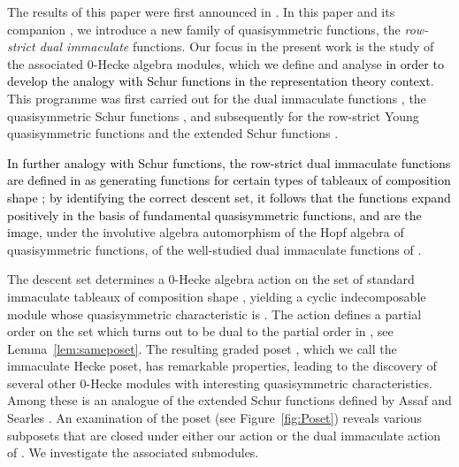 \documentclass[12pt,letterpaper]{amsart}
\newcommand{\svw}{\textcolor{black}}
\theoremstyle{definition}
\begin{document}
The results of this paper were  first announced in \cite{NSvWVW2022FPSAC}. 
In this paper and its companion \cite{NSvWVW2023}, we introduce a new family of quasisymmetric functions, the \emph{row-strict dual immaculate} functions.  Our focus in the present work is the study of the associated 0-Hecke algebra modules, which we define and analyse \svw{in order to develop the analogy with Schur functions in the representation theory context}. This programme was first carried out for the dual immaculate functions \cite{BBSSZ2015}, the quasisymmetric Schur functions \cite{TvW2015}, and subsequently for the row-strict Young quasisymmetric functions \cite{BS2021} and the extended Schur functions \cite{S2020}.

\svw{In further analogy with Schur functions, the row-strict dual immaculate functions  are  defined in  \cite{NSvWVW2023} as generating functions for certain types of tableaux of composition shape ; by identifying the correct descent set, it follows that the functions 
 expand positively in the basis of fundamental quasisymmetric functions, and are the image,} under the involutive algebra automorphism  of the Hopf algebra  of quasisymmetric functions, of the well-studied dual immaculate functions of \cite{BBSSZ2015}.

The descent set  determines a 0-Hecke algebra action on the set  of standard immaculate tableaux of composition shape , yielding a cyclic indecomposable module whose quasisymmetric characteristic is .  The action defines a partial order on the set  which turns out to be dual to the partial order in \cite{BBSSZ2015}, see Lemma~\ref{lem:sameposet}.  The resulting graded poset , which we call the immaculate Hecke poset,  has remarkable properties, leading to the discovery of several other 0-Hecke modules with interesting quasisymmetric characteristics.  Among these is an analogue of the extended Schur functions defined by Assaf and Searles \cite{AS2019}. An examination of the poset (see Figure~\ref{fig:Poset}) reveals various subposets that are closed under either our action or the dual immaculate action of \cite{BBSSZ2015}.  We  investigate the associated submodules.
\end{document}
